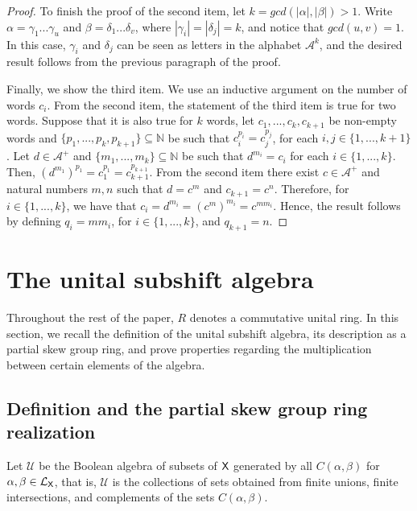 \documentclass[a4paper,12pt]{amsart}
\theoremstyle{definition}
\theoremstyle{remark}
\numberwithin{equation}{section}
\newcommand{\osf}{{\normalfont \textsf{X}}}
\newcommand{\lang}{\CL_{\osf}}
\newcommand{\alf}{\mathscr{A}}
\newcommand{\N}{\mathbb{N}}
\newcommand{\CL}{\mathcal{L}}
\newcommand{\TCB}{\mathcal{U}}
\begin{document}
\begin{proof}
To finish the proof of the second item, let $k=gcd(|\alpha|, |\beta|)>1$. Write $\alpha=\gamma_1...\gamma_u$ and $\beta=\delta_1...\delta_v$, where $|\gamma_i|=|\delta_j|=k$, and notice that $gcd(u,v)=1$. In this case, $\gamma_i$ and $\delta_j$ can be seen as letters in the alphabet $\alf^k$, and the desired result follows from the previous paragraph of the proof.

Finally, we show the third item. We use an inductive argument on the number of words $c_i$. From the second item, the statement of the third item is true for two words. Suppose that it is also true for $k$ words, let $c_1,...,c_k,{c}_{k+1}$ be non-empty words and $\{p_1,...,p_k, p_{k+1}\}\subseteq \N$ be such that $c_i^{p_i}=c_j^{p_j}$, for each $i,j\in \{1,...,k+1\}$. Let $d\in \alf^+$ and $\{m_1,...,m_k\}\subseteq \N$ be such that $d^{m_i}=c_i$ for each $i\in \{1,...,k\}$. 
Then, $(d^{m_1})^{p_1}=c_1^{p_1}= c_{k+1}^{p_{k+1}}$. %
 From the second item there exist $c\in \alf^+$ and natural numbers $m,n$ such that $d=c^m$ and $c_{k+1}=c^n$. Therefore, for $i\in \{1,...,k\}$, we have that $c_i=d^{m_i}=(c^m)^{m_i}=c^{mm_i}$. Hence, the result follows by defining $q_i=mm_i$, for $i\in\{1,...,k\}$, and $q_{k+1}=n$. 
\end{proof}

\section{The unital subshift algebra}\label{unital}

Throughout the rest of the paper, $R$ denotes a commutative unital ring. In this section, we recall the definition of the unital subshift algebra, its description as a partial skew group ring, and prove properties regarding the multiplication between certain elements of the algebra.

\subsection{Definition and the partial skew group ring realization}\label{theoretic.pa}
Let $\TCB$ be the Boolean algebra of subsets of $\osf$ generated by all $C(\alpha,\beta)$ for $\alpha,\beta\in\lang$, that is, $\TCB$ is the collections of sets obtained from finite unions, finite intersections, and complements of the sets $C(\alpha,\beta)$. %
\end{document}
